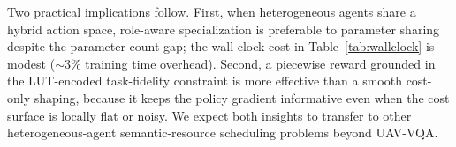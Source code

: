 Two practical implications follow. First, when heterogeneous agents
share a hybrid action space, role-aware specialization is preferable to
parameter sharing despite the parameter count gap; the wall-clock cost
in Table~\ref{tab:wallclock} is modest ($\sim 3\%$ training time
overhead). Second, a piecewise reward grounded in the LUT-encoded
task-fidelity constraint is more effective than a smooth cost-only
shaping, because it keeps the policy gradient informative even when
the cost surface is locally flat or noisy. We expect both insights to
transfer to other heterogeneous-agent semantic-resource scheduling
problems beyond UAV-VQA.
